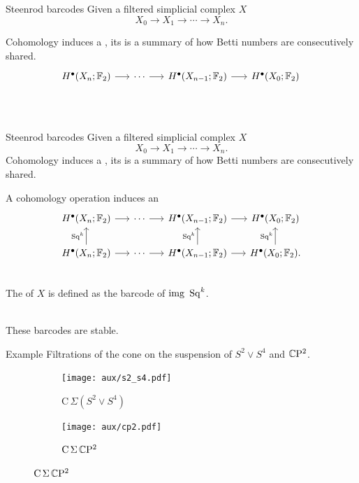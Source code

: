 \begin{frame}[fragile]{Steenrod barcodes}
	\pause
	Given a filtered simplicial complex $X$
	\[
	X_0 \to X_1 \to \cdots \to X_n.
	\]

	\pause
	Cohomology induces a , its  is a summary of how Betti numbers are consecutively shared.\\

	\smallskip
	\phantom{A cohomology operation induces an endomorphism}
	\[
	\begin{tikzcd}[column sep = 15]
		H^\bullet(X_n; \Ftwo) \arrow[r] & \cdots \arrow[r] & H^\bullet(X_{n-1}; \Ftwo) \arrow[r] & H^\bullet(X_0; \Ftwo) \\
		\phantom{H^\bullet(X_n; \Ftwo)} \arrow[u, "\phantom{\Sq^k}", phantom] & \phantom{\cdots} & \phantom{H^\bullet(X_{n-1}; \Ftwo)} & \phantom{H^\bullet(X_0; \Ftwo)} \arrow[u, "\phantom{\Sq^k}", phantom] \phantom{.}
	\end{tikzcd}
	\]
\end{frame}

\begin{frame}[fragile]{Steenrod barcodes}
	Given a filtered simplicial complex $X$
	\[
	X_0 \to X_1 \to \cdots \to X_n.
	\]
	Cohomology induces a , its  is a summary of how Betti numbers are consecutively shared.

	\smallskip
	A cohomology operation induces an 
	\[
	\begin{tikzcd}[column sep = 15]
	H^\bullet(X_n; \Ftwo) \arrow[r] & \cdots \arrow[r] & H^\bullet(X_{n-1}; \Ftwo) \arrow[r] & H^\bullet(X_0; \Ftwo) \\
	H^\bullet(X_n; \Ftwo) \arrow[u, "\Sq^k"] \arrow[r] & \cdots \arrow[r] & H^\bullet(X_{n-1}; \Ftwo) \arrow[u, "\Sq^k"] \arrow[r] & H^\bullet(X_0; \Ftwo) \arrow[u, "\Sq^k"].
	\end{tikzcd}
	\]

	\pause
	 \\
	The  of $X$ is defined as the barcode of $\mathrm{img}\ \Sq^k$.

	\pause\medskip
	 \\
	These barcodes are stable.
\end{frame}

\begin{frame}{Example} \pause
	Filtrations of the cone on the suspension of $S^2 \vee S^4$ and $\mathbb{C} \mathrm{P}^2$.

	\pause
	\begin{figure}
		\centering
		\begin{subfigure}[b]{0.49\textwidth}
			\centering
			\texttt{[image: aux/s2\_s4.pdf]}
			\caption{$\mathrm C\,\Sigma(S^2 \vee S^4)$}
			\label{f:s2_s4}
		\end{subfigure}
		\begin{subfigure}[b]{0.49\textwidth}
			\centering
			\texttt{[image: aux/cp2.pdf]}
			\caption{$\mathrm C\,\Sigma\,\mathbb{C}\mathrm{P}^2$}
			\label{f:cp2}
		\end{subfigure}
	\end{figure}
\end{frame}

